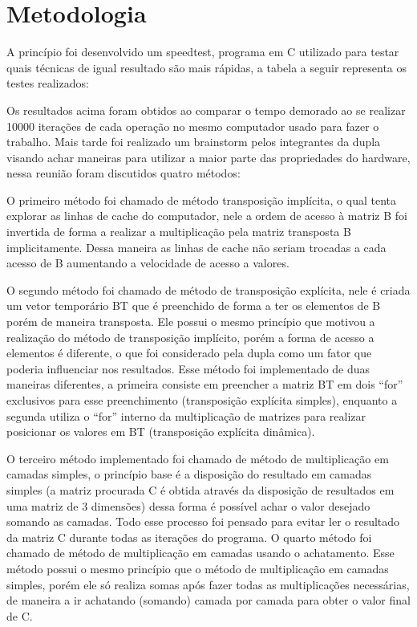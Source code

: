 \documentclass[a4paper, 10pt]{article}
\begin{document}
\section{Metodologia}
A princípio foi desenvolvido um speedtest, programa em C utilizado para testar quais técnicas de igual resultado são mais rápidas, a tabela a seguir representa os testes realizados:

Os resultados acima foram obtidos ao comparar o tempo demorado ao se realizar 10000 iterações de cada operação no mesmo computador usado para fazer o trabalho. 
Mais tarde foi realizado um brainstorm pelos integrantes da dupla visando achar maneiras para utilizar a maior parte das propriedades do hardware, nessa reunião foram discutidos quatro métodos:

O primeiro método foi chamado de método transposição implícita, o qual tenta explorar as linhas de cache do computador, nele a ordem de acesso à matriz B foi invertida de forma a realizar a multiplicação pela matriz transposta B implicitamente. Dessa maneira as linhas de cache não seriam trocadas a cada acesso de B aumentando a velocidade de acesso a valores.

O segundo método foi chamado de método de transposição explícita, nele é criada um vetor temporário BT que é preenchido de forma a ter os elementos de B porém de maneira transposta. Ele possui o mesmo princípio que motivou a realização do método de transposição implícito, porém a forma de acesso a elementos é diferente, o que foi considerado pela dupla como um fator que poderia influenciar nos resultados. Esse método foi implementado de duas maneiras diferentes, a primeira consiste em preencher a matriz BT em dois “for” exclusivos para esse preenchimento (transposição explícita simples), enquanto a segunda utiliza o “for” interno da multiplicação de matrizes para realizar posicionar os valores em BT (transposição explícita dinâmica).

O terceiro método implementado foi chamado de método de multiplicação em camadas simples, o princípio base é a disposição do resultado em camadas simples (a matriz procurada C é obtida através da disposição de resultados em uma matriz de 3 dimensões) dessa forma é possível achar o valor desejado somando as camadas. Todo esse processo foi pensado para evitar ler o resultado da matriz C durante todas as iterações do programa.
O quarto método foi chamado de método de multiplicação em camadas usando o achatamento. Esse método possui o mesmo princípio que o método de multiplicação em camadas simples, porém ele só realiza somas após fazer todas as multiplicações necessárias, de maneira a ir achatando (somando) camada por camada para obter o valor final de C.
\end{document}
